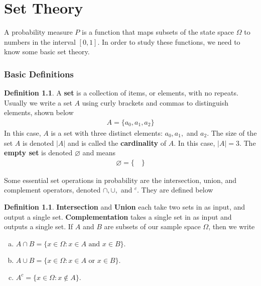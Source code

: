 \documentclass{tufte-book}
\theoremstyle{definition}
\numberwithin{theorem}{section}
\newtheorem{definition}[theorem]{Definition}
\numberwithin{definition}{section}
\numberwithin{lemma}{section}
\numberwithin{corollary}{section}
\numberwithin{proposition}{section}
\numberwithin{remark}{section}
\numberwithin{claim}{section}
\numberwithin{observation}{section}
\numberwithin{fact}{section}
\numberwithin{assumption}{section}
\numberwithin{example}{section}
\numberwithin{exercise}{section}
\begin{document}
\chapter{Set Theory}

A probability measure $P$ is a function that maps subsets of the state space $\Omega$ to numbers in the interval $[0,1]$. In order to study these functions, we need to know some basic set theory. 

\subsection{Basic Definitions}

\begin{definition}
A \textbf{set} is a collection of items, or elements, with no repeats. Usually we write a set $A$ using curly brackets and commas to distinguish elements, shown below
\begin{align*}
A = \{a_0, a_1, a_2\}
\end{align*}
In this case, $A$ is a set with three distinct elements: $a_0, a_1,$ and $a_2$. The size of the set $A$ is denoted $|A|$ and is called the \textbf{cardinality} of $A$. In this case, $|A| = 3$. The \textbf{empty set} is denoted $\varnothing$ and means
\begin{align*}
\varnothing = \{\hspace{1em}\}
\end{align*}
\end{definition}

Some essential set operations in probability are the intersection, union, and complement operators, denoted $\cap, \cup,$ and $^c$. They are defined below
\begin{definition}
\textbf{Intersection} and \textbf{Union} each take two sets in as input, and output a single set. \textbf{Complementation} takes a single set in as input and outputs a single set. If $A$ and $B$ are subsets of our sample space $\Omega$, then we write
\begin{enumerate}[(a)]
\item $A \cap B = \{x \in \Omega : x \in A \text{ and } x \in B\}$. 

\item $A \cup B = \{x \in \Omega : x \in A \text{ or } x \in B\}$.

\item $A^c = \{x \in \Omega : x \notin A\}$.
\end{enumerate}
\end{definition}
\end{document}
